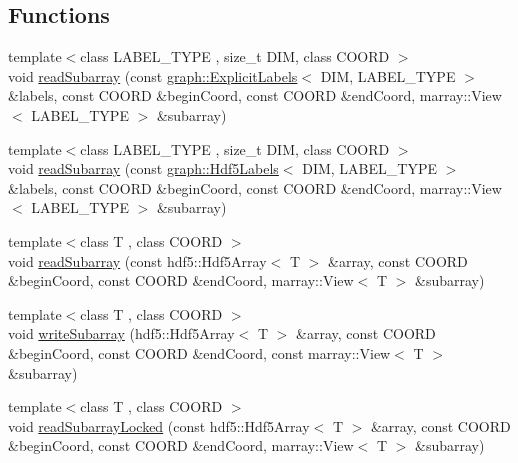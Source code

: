 \subsection*{Functions}
\begin{DoxyCompactItemize}
\item 
{\footnotesize template$<$class L\+A\+B\+E\+L\+\_\+\+T\+Y\+P\+E , size\+\_\+t D\+I\+M, class C\+O\+O\+R\+D $>$ }\\void \hyperlink{namespacenifty_1_1tools_a5d64102d01cdba610156da964f4b2581}{read\+Subarray} (const \hyperlink{classnifty_1_1graph_1_1ExplicitLabels}{graph\+::\+Explicit\+Labels}$<$ D\+I\+M, L\+A\+B\+E\+L\+\_\+\+T\+Y\+P\+E $>$ \&labels, const C\+O\+O\+R\+D \&begin\+Coord, const C\+O\+O\+R\+D \&end\+Coord, marray\+::\+View$<$ L\+A\+B\+E\+L\+\_\+\+T\+Y\+P\+E $>$ \&subarray)
\item 
{\footnotesize template$<$class L\+A\+B\+E\+L\+\_\+\+T\+Y\+P\+E , size\+\_\+t D\+I\+M, class C\+O\+O\+R\+D $>$ }\\void \hyperlink{namespacenifty_1_1tools_a32fca5240a87f007e50dac403671cfa0}{read\+Subarray} (const \hyperlink{classnifty_1_1graph_1_1Hdf5Labels}{graph\+::\+Hdf5\+Labels}$<$ D\+I\+M, L\+A\+B\+E\+L\+\_\+\+T\+Y\+P\+E $>$ \&labels, const C\+O\+O\+R\+D \&begin\+Coord, const C\+O\+O\+R\+D \&end\+Coord, marray\+::\+View$<$ L\+A\+B\+E\+L\+\_\+\+T\+Y\+P\+E $>$ \&subarray)
\item 
{\footnotesize template$<$class T , class C\+O\+O\+R\+D $>$ }\\void \hyperlink{namespacenifty_1_1tools_a8b0e46da1e0ed94de12c1ea0b89a07d9}{read\+Subarray} (const hdf5\+::\+Hdf5\+Array$<$ T $>$ \&array, const C\+O\+O\+R\+D \&begin\+Coord, const C\+O\+O\+R\+D \&end\+Coord, marray\+::\+View$<$ T $>$ \&subarray)
\item 
{\footnotesize template$<$class T , class C\+O\+O\+R\+D $>$ }\\void \hyperlink{namespacenifty_1_1tools_a46fa9e03448a433ba5ca485435b540b8}{write\+Subarray} (hdf5\+::\+Hdf5\+Array$<$ T $>$ \&array, const C\+O\+O\+R\+D \&begin\+Coord, const C\+O\+O\+R\+D \&end\+Coord, const marray\+::\+View$<$ T $>$ \&subarray)
\item 
{\footnotesize template$<$class T , class C\+O\+O\+R\+D $>$ }\\void \hyperlink{namespacenifty_1_1tools_a562317b7926e706fa893b03ad3bfdfda}{read\+Subarray\+Locked} (const hdf5\+::\+Hdf5\+Array$<$ T $>$ \&array, const C\+O\+O\+R\+D \&begin\+Coord, const C\+O\+O\+R\+D \&end\+Coord, marray\+::\+View$<$ T $>$ \&subarray)
\item 

\end{DoxyCompactItemize}
